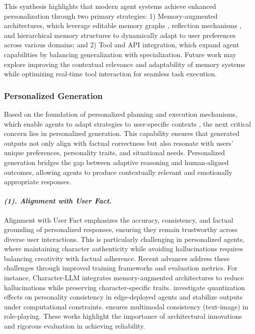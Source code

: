 This synthesis highlights that modern agent systems achieve enhanced personalization through two primary strategies: 1) Memory-augmented architectures, which leverage editable memory graphs \cite{wang2024crafting}, reflection mechanisms \cite{park2023generative}, and hierarchical memory structures \cite{wang2023user} to dynamically adapt to user preferences across various domains; and 2) Tool and API integration, which expand agent capabilities by balancing generalization  with specialization. Future work may explore improving the contextual relevance and adaptability of memory systems while optimizing real-time tool interaction for seamless task execution.



\subsubsection{\textbf{Personalized Generation}}
Based on the foundation of personalized planning and execution mechanisms, which enable agents to adapt strategies to user-specific contexts \cite{huang2022language,zhangbootstrap}, the next critical concern lies in personalized generation. This capability ensures that generated outputs not only align with factual correctness but also resonate with users' unique preferences, personality traits, and situational needs. Personalized generation bridges the gap between adaptive reasoning and human-aligned outcomes, allowing agents to produce contextually relevant and emotionally appropriate responses.

\paragraph{\textbf{\textit{{(1). Alignment with User Fact.}}}}
Alignment with User Fact emphasizes the accuracy, consistency, and factual grounding of personalized responses, ensuring they remain trustworthy across diverse user interactions. This is particularly challenging in personalized agents, where maintaining character authenticity while avoiding hallucinations requires balancing creativity with factual adherence.
Recent advances address these challenges through improved training frameworks and evaluation metrics. For instance, Character-LLM \cite{shao2023character} integrates memory-augmented architectures to reduce hallucinations while preserving character-specific traits. \citet{wang2024investigating} investigate quantization effects on personality consistency in edge-deployed agents and stabilize outputs under computational constraints. \citet{dai2024mmrole} ensures multimodal consistency (text-image) in role-playing. These works highlight the importance of architectural innovations and rigorous evaluation in achieving reliability.

